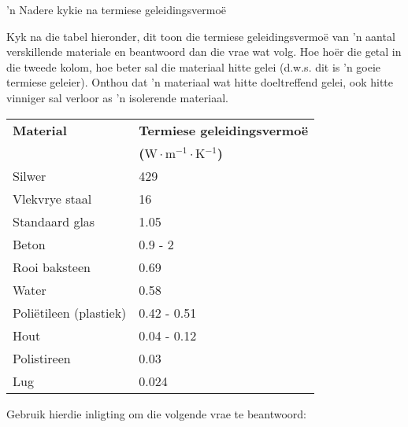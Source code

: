             \begin{Investigation}{ 'n Nadere kykie na termiese geleidingsvermo\"e}
{            \nopagebreak
      \label{m38706*id66744}      Kyk na die tabel hieronder, dit toon die termiese geleidingsvermo\"e van 'n aantal verskillende materiale en beantwoord dan die vrae wat volg. Hoe ho\"er die getal in die tweede kolom, hoe beter sal die materiaal hitte gelei (d.w.s. dit is 'n goeie termiese geleier). Onthou dat 'n materiaal wat hitte doeltreffend gelei, ook hitte vinniger sal verloor as 'n isolerende materiaal.\par 
          \begin{table}[H]
        \begin{center}
      \label{m38706*id66753}
    \noindent
      \begin{tabular}{|l|l|}\hline
\textbf{Material} & \textbf{Termiese geleidingsvermoë} \\ 
                 &  \textbf{($\text{W}\ensuremath{\cdot}\text{m}{}^{-1}\ensuremath{\cdot}\text{K}{}^{-1}$) } \\ \hline
Silwer & 429 \\ \hline
Vlekvrye staal & 16 \\ \hline
Standaard glas & 1.05 \\ \hline
Beton & 0.9 - 2 \\ \hline
Rooi baksteen & 0.69 \\ \hline
Water & 0.58 \\ \hline
Poli\"etileen (plastiek) & 0.42 - 0.51 \\ \hline
Hout & 0.04 - 0.12 \\ \hline
Polistireen & 0.03 \\ \hline
Lug & 0.024 \\ \hline
    \end{tabular}
      \end{center}
\end{table}
    \par
      \label{m38706*id67009}Gebruik hierdie inligting om die volgende vrae te beantwoord:\par 
}
\end{Investigation}
